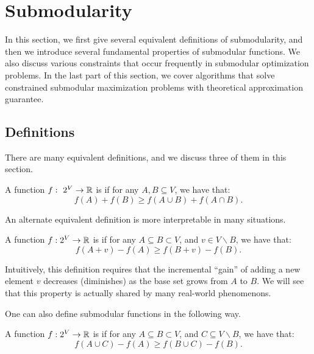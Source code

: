\section{Submodularity}
\label{sec:submodularity}
In this section, we first give several equivalent definitions of submodularity, and then we introduce several fundamental properties of submodular functions. We also discuss various constraints that occur frequently in submodular optimization problems. In the last part of this section, we cover algorithms that solve constrained submodular maximization problems with theoretical approximation guarantee. 

\subsection{Definitions}
There are many equivalent definitions, and we discuss three of them in this section. 

\begin{definition}
  \label{def:sub-concave}
  A function $f:~2^V \rightarrow \mathbb{R}$ is  if for any $A, B \subseteq V$, we have that:
  \begin{equation}
    \label{eq:sub-concave}
    f(A) + f(B) \geq f(A \cup B) + f(A \cap B).
  \end{equation}
\end{definition}

An alternate equivalent definition is more interpretable in many situations.

\begin{definition}
  \label{def:sub-diminishing}
  A function $f: 2^V \rightarrow \mathbb{R}$ is  if for any $A \subseteq B \subset V$, and $v \in V\backslash B$, we have that:
  \begin{equation}
    \label{eq:sub-diminishing}
    f(A + v) - f(A) \geq f(B + v) - f(B).
  \end{equation}
\end{definition}

Intuitively, this definition requires that the incremental ``gain'' of adding a new element $v$ decreases (diminishes) as the base set grows from $A$ to $B$. We will see that this property is actually shared by many real-world phenomenons.

One can also define submodular functions in the following way.

\begin{definition}
  \label{def:sub-diminishing-group}
  A function $f: 2^V \rightarrow \mathbb{R}$ is  if for any $A \subseteq B \subset V$, and $C \subseteq V\backslash B$, we have that:
  \begin{equation}
    \label{eq:sub-diminishing-group}
    f(A \cup C) - f(A) \geq f(B \cup C) - f(B).
  \end{equation}
\end{definition}


